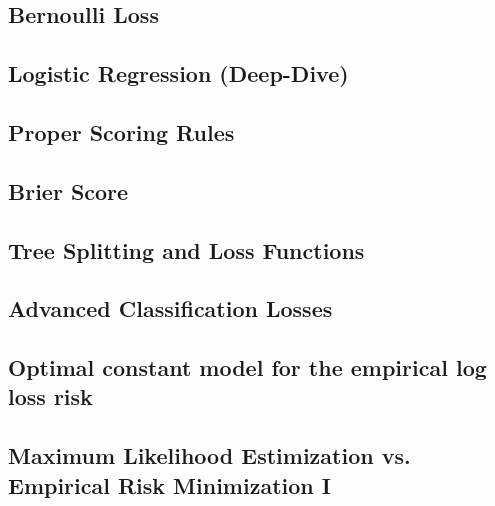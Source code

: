 \subsection{Bernoulli Loss}


\subsection{Logistic Regression (Deep-Dive)}


\subsection{Proper Scoring Rules}


\subsection{Brier Score}


\subsection{Tree Splitting and Loss Functions}


\subsection{Advanced Classification Losses}


\subsection{Optimal constant model for the empirical log loss risk}


\subsection{Maximum Likelihood Estimization vs. Empirical Risk Minimization I}


